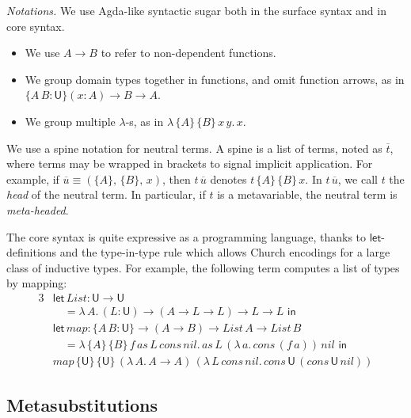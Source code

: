 \documentclass[acmsmall,review,anonymous,prologue,dvipsnames]{acmart}\settopmatter{printfolios=true,printccs=false,printacmref=false}
\newcommand{\slet}{\boldsymbol{\mathsf{let}}}
\renewcommand{\sin}{\boldsymbol{\mathsf{in}}}
\renewcommand{\U}{\mathsf{U}}
\newcommand{\mi}[1]{\mathit{#1}}
\theoremstyle{remark}
\begin{document}
\emph{Notations.} We use Agda-like syntactic sugar both in the surface syntax and
in core syntax.
\begin{itemize}
  \item We use $A \to B$ to refer to non-dependent functions.
  \item We group domain types together in functions, and omit function arrows,
    as in $\{A\,B : \U\}(x : A) \to B \to A$.
  \item We group multiple $\lambda$-s, as in $\lambda\,\{A\}\,\{B\}\,x\,y.\,x$.
\end{itemize}
\begin{definition}[Spines]\label{def:spines}
  We use a spine notation for neutral terms. A spine is a list of
  terms, noted as $\overline{t}$, where terms may be wrapped in brackets to
  signal implicit application. For example, if $\overline{u} \equiv
  (\{A\},\,\{B\},\,x)$, then $t\,\overline{u}$ denotes $t\,\{A\}\,\{B\}\,x$.  In
  $t\,\overline{u}$, we call $t$ the \emph{head} of the neutral term. In
  particular, if $t$ is a metavariable, the neutral term is \emph{meta-headed}.
\end{definition}
\begin{example}
The core syntax is quite expressive as a programming language, thanks to
$\slet$-definitions and the
type-in-type rule which allows Church encodings for a large class of inductive
types. For example, the following term computes a list of types by mapping:
\begin{alignat*}{3}
  & \slet\,List : \U\to\U\\
  & \hspace{1em}= \lambda\,A.\,(L : \U)\to(A\to L\to L)\to L\to L\,\,\sin\\
  & \slet\,\mi{map} : \{A\,B : \U\}\to (A \to B) \to \mi{List}\,A \to \mi{List}\,B\\
  & \hspace{1em}=
  \lambda\,\{A\}\,\{B\}\,f\,as\,L\,\mi{cons}\,\mi{nil}.\,as\,L\,(\lambda\,a.\,\mi{cons}\,(f\,a))\,nil\,\,\sin\\
  & \mi{map}\,\{\U\}\,\{\U\}\,(\lambda\,A.\, A \to A)\,(\lambda\,L\,\mi{cons}\,\mi{nil}.\,\mi{cons}\,\U\,(\mi{cons}\,\U\,\mi{nil}))
\end{alignat*}
\end{example}

\subsection{Metasubstitutions}\label{sec:metasubstitutions}
\end{document}
